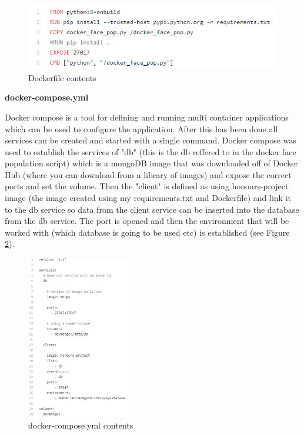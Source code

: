 \documentclass[12pt,a4paper]{article}
\begin{document}
\begin{figure}[!ht]
    \centering
    \includegraphics[width=1.0\textwidth]{Figs/Dockerfile.PNG} 
    \caption{Dockerfile contents} 
    \label{Dockerfile}
\end{figure}  

\textbf{docker-compose.yml} 

Docker compose is a tool for defining and running multi container applications which can be used to configure the application. After this has been done all services can be created and started with a single command. Docker compose was used to establish the services of "db" (this is the db reffered to in the docker face population script) which is a mongoDB image that was downloaded off of Docker Hub (where you can download from a library of images) and expose the correct ports and set the volume. Then the "client" is defined as using honours-project image (the image created using my requirements.txt and Dockerfile) and link it to the db service so data from the client service can be inserted into the database from the db service. The port is opened and then the environment that will be worked with (which database is going to be used etc) is established (see Figure \ref{Dockercompose}). 

\begin{figure}[!ht]
    \centering
    \includegraphics[width=0.4\textwidth]{Figs/dockercomposecode.PNG} 
    \caption{docker-compose.yml contents} 
    \label{Dockercompose}
\end{figure} 
\end{document}
